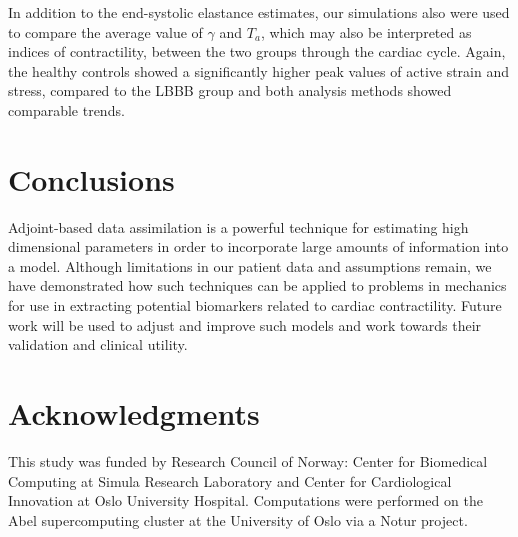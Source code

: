 In addition to the end-systolic elastance estimates, our simulations also were used to
compare the average value of $\gamma$ and $T_a$, which may also be
interpreted as indices of contractility, between the two groups
through the cardiac cycle. Again, the healthy controls showed a
significantly higher peak values of active strain and stress, compared
to the LBBB group and both  analysis methods showed comparable trends. 


\section{Conclusions}

Adjoint-based data assimilation is a powerful technique for
estimating high dimensional parameters in order to incorporate large
amounts of information into a model. Although limitations in our
patient data and assumptions remain, we have demonstrated how such
techniques can be applied to problems in mechanics for use in
extracting potential biomarkers related to cardiac
contractility. Future work will be used to adjust and improve such
models and work towards their validation and clinical utility.


\section*{Acknowledgments}
This study was funded by Research Council of Norway: Center for
Biomedical Computing at Simula Research Laboratory and Center for
Cardiological Innovation at Oslo University Hospital.
Computations were performed on the Abel supercomputing cluster at the 
University of Oslo via a Notur project.

\pagebreak




